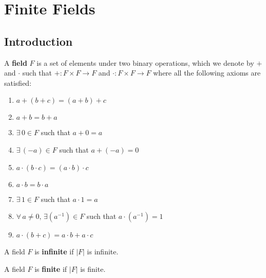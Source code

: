 \chapter{Finite Fields}

\section{Introduction}
\begin{defbox}
    \begin{definition}
        A \textbf{field} $ F $ is a set of elements under two binary operations,
        which we denote by $ + $ and $ \cdot $ such that
        $ +:F\times F\rightarrow F $ and $ \cdot:F\times F\rightarrow F $
        where all the following axioms are satisfied:
        \begin{enumerate}[V1]
            \item $ a+(b+c)=(a+b)+c $
            \item $ a+b=b+a $
            \item $ \exists\, 0\in F $ such that $ a+0=a $
            \item $ \exists\, (-a)\in F $ such that $ a+(-a)=0 $
            \item $ a\cdot (b\cdot c)=(a\cdot b)\cdot c $
            \item $ a\cdot b=b\cdot a $
            \item $ \exists\, 1\in F $ such that $ a\cdot 1=a $
            \item $ \forall\,a\neq 0,\,\exists (a^{-1})\in F $ such that
                  $ a\cdot (a^{-1})=1 $
            \item $ a\cdot (b+c)=a\cdot b+a\cdot c $
        \end{enumerate}
    \end{definition}
\end{defbox}

\begin{defbox}
    \begin{definition}
        A field $ F $ is \textbf{infinite} if $ |F| $ is infinite.
    \end{definition}
\end{defbox}

\begin{defbox}
    \begin{definition}
        A field $ F $ is \textbf{finite} if $ |F| $ is finite.
    \end{definition}
\end{defbox}

